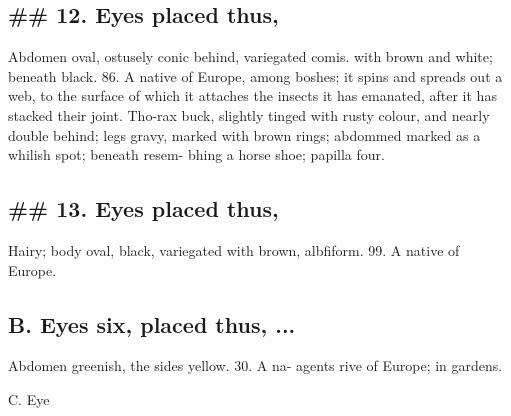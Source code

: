 \subsection*{\#\# 12. Eyes placed thus,}
Abdomen oval, ostusely conic behind, variegated comis. with brown and white; beneath black. 86. A native of Europe, among boshes; it spins and spreads out a web, to the surface of which it attaches the insects it has emanated, after it has stacked their joint. Tho-rax buck, slightly tinged with rusty colour, and nearly double behind; legs gravy, marked with brown rings; abdommed marked as a whilish spot; beneath resem- bhing a horse shoe; papilla four.\par\medskip
\subsection*{\#\# 13. Eyes placed thus,}
Hairy; body oval, black, variegated with brown, albfiform. 99. A native of Europe.\par\medskip
\subsection*{B. Eyes six, placed thus, ...}
Abdomen greenish, the sides yellow. 30. A na- agents rive of Europe; in gardens.\par\medskip
C. Eye\par\medskip
